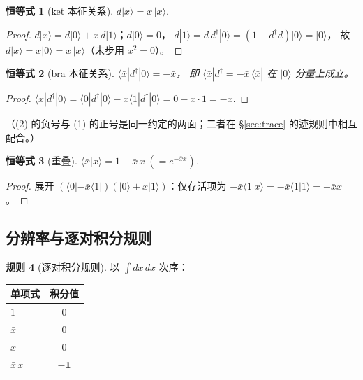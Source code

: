 \documentclass[11pt,a4paper]{ctexart}
\theoremstyle{plain}
\newtheorem{identity}{恒等式}[section]
\theoremstyle{definition}
\newtheorem{rulethm}[identity]{规则}
\theoremstyle{remark}
\begin{document}
\begin{identity}[ket 本征关系]\label{id:ket}
$d|x\rangle = x\,|x\rangle$.
\end{identity}
\begin{proof}
$d|x\rangle = d|0\rangle + x\,d|1\rangle$；$d|0\rangle = 0$，
$d|1\rangle = d\,d^\dagger|0\rangle = (1 - d^\dagger d)|0\rangle = |0\rangle$，
故 $d|x\rangle = x|0\rangle = x\,|x\rangle$（末步用 $x^2 = 0$）。
\end{proof}

\begin{identity}[bra 本征关系]\label{id:bra}
$\langle\bar x| d^\dagger |0\rangle = -\bar x$，
即 $\langle\bar x|d^\dagger = -\bar x\,\langle\bar x|$ 在 $|0\rangle$ 分量上成立。
\end{identity}
\begin{proof}
$\langle\bar x|d^\dagger|0\rangle = \langle0|d^\dagger|0\rangle - \bar x\langle1|d^\dagger|0\rangle
= 0 - \bar x\cdot 1 = -\bar x$.
\end{proof}

（(2) 的负号与 (1) 的正号是同一约定的两面；二者在 \S\ref{sec:trace} 的迹规则中相互配合。）

\begin{identity}[重叠]\label{id:overlap}
$\langle\bar x|x\rangle = 1 - \bar x\,x \;(= e^{-\bar x x})$.
\end{identity}
\begin{proof}
展开 $(\langle0| - \bar x\langle1|)(|0\rangle + x|1\rangle)$：仅存活项为
$-\bar x\langle1|x\rangle = -\bar x\langle1|1\rangle = -\bar x x$。
\end{proof}

\subsection{分辨率与逐对积分规则}

\begin{rulethm}[逐对积分规则]\label{rule:int}
以 $\int d\bar x\, dx$ 次序：
\begin{center}
\begin{tabular}{lc}
\toprule
单项式 & 积分值 \\
\midrule
$1$          & $0$ \\
$\bar x$     & $0$ \\
$x$          & $0$ \\
$\bar x\,x$  & $\mathbf{-1}$ \\
\bottomrule
\end{tabular}
\end{center}
\end{rulethm}
\end{document}
